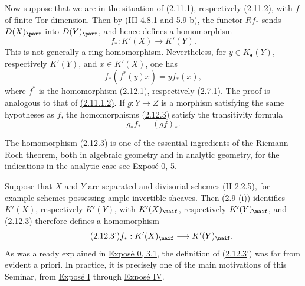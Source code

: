 Now suppose that we are in the situation of \hyperlink{sga6.e04.para.2-11-1}{(2.11.1)}, respectively \hyperlink{sga6.e04.para.2-11-2}{(2.11.2)}, with \(f\) of finite Tor-dimension. Then by (\hyperlink{sga6.e03.cor.4-8-1}{III 4.8.1} and \hyperlink{sga6.e03.rem.5-8}{5.9} b), the functor \(Rf_*\) sends \(D(X)_{\parf}\) into \(D(Y)_{\parf}\), and hence defines a homomorphism
\begin{equation}\tag{2.12.3}
 f_*:K'(X)\longrightarrow K'(Y).
\end{equation}
This is not generally a ring homomorphism. Nevertheless, for \(y\in K_{\bullet}(Y)\), respectively \(K'(Y)\), and \(x\in K'(X)\), one has
\begin{equation}\tag{2.12.4}
 f_*(f^*(y)x)=y f_*(x),
\end{equation}
where \(f^*\) is the homomorphism \hyperlink{sga6.e04.eq.2-12-1}{(2.12.1)}, respectively \hyperlink{sga6.e04.eq.2-7-1}{(2.7.1)}. The proof is analogous to that of \hyperlink{sga6.e04.eq.2-11-1-2}{(2.11.1.2)}. If \(g:Y\to Z\) is a morphism satisfying the same hypotheses as \(f\), the homomorphisms \hyperlink{sga6.e04.eq.2-12-3}{(2.12.3)} satisfy the transitivity formula
\begin{equation}\tag{2.12.3.1}
 g_*f_*=(gf)_*.
\end{equation}

The homomorphism \hyperlink{sga6.e04.eq.2-12-3}{(2.12.3)} is one of the essential ingredients of the Riemann--Roch theorem, both in algebraic geometry and in analytic geometry, for the indications in the analytic case see \hyperlink{sga6.e00.sec.5}{Exposé 0, 5}.

Suppose that \(X\) and \(Y\) are separated and divisorial schemes (\hyperlink{sga6.e02.def.2-2-5}{II 2.2.5}), for example schemes possessing ample invertible sheaves. Then \hyperlink{sga6.e04.para.2-9}{(2.9 (i))} identifies \(K'(X)\), respectively \(K'(Y)\), with \(K'(X)_{\naif}\), respectively \(K'(Y)_{\naif}\), and \hyperlink{sga6.e04.eq.2-12-3}{(2.12.3)} therefore defines a homomorphism
\begin{equation}\tag{2.12.3'}
 f_*:K'(X)_{\naif}\longrightarrow K'(Y)_{\naif}.
\end{equation}
As was already explained in \hyperlink{sga6.e00.sec.3.1}{Exposé 0, 3.1}, the definition of (\hyperlink{sga6.e04.eq.2-12-3}{2.12.3}') was far from evident a priori. In practice, it is precisely one of the main motivations of this Seminar, from \hyperlink{sga6.e01.expose}{Exposé I} through \hyperlink{sga6.e04.expose}{Exposé IV}.

